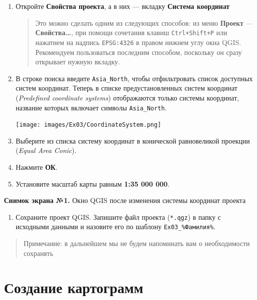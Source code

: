 \documentclass[
  12pt,
]{book}
\providecommand{\tightlist}{%
  \setlength{\itemsep}{0pt}\setlength{\parskip}{0pt}}
\begin{document}
\begin{enumerate}
\def\labelenumi{\arabic{enumi}.}
\item
  Откройте \textbf{Свойства проекта}, а в них --- вкладку \textbf{Система координат}

  \begin{quote}
  Это можно сделать одним из следующих способов: из меню \textbf{Проект} --- \textbf{Свойства\ldots{}}, при помощи сочетания клавиш \texttt{Ctrl+Shift+P} или нажатием на надпись \texttt{EPSG:4326} в правом нижнем углу окна QGIS. Рекомендуем пользоваться последним способом, поскольку он сразу открывает нужную вкладку.
  \end{quote}
\item
  В строке поиска введите \texttt{Asia\_North}, чтобы отфильтровать список доступных систем координат. Теперь в списке предустановленных систем координат (\emph{Predefined coordinate systems}) отображаются только системы координат, название которых включает символы \texttt{Asia\_North}.

  \texttt{[image: images/Ex03/CoordinateSystem.png]}
\item
  Выберите из списка систему координат в конической равновеликой проекции (\emph{Equal Area Conic}).
\item
  Нажмите \textbf{ОК}.
\item
  Установите масштаб карты равным \textbf{1:35 000 000}.
\end{enumerate}

\textbf{Снимок экрана №1.} Окно QGIS после изменения системы координат проекта

\begin{enumerate}
\def\labelenumi{\arabic{enumi}.}
\setcounter{enumi}{4}
\tightlist
\item
  Сохраните проект QGIS. Запишите файл проекта (\texttt{*.qgz}) в папку с исходными данными и назовите его по шаблону \texttt{Ex03\_\%Фамилия\%}.
\end{enumerate}

\begin{quote}
Примечание: в дальнейшем мы не будем напоминать вам о необходимости сохранять
\end{quote}

\hypertarget{map-design-population-fill-color}{%
\section{Создание картограмм}\label{map-design-population-fill-color}}
\end{document}
